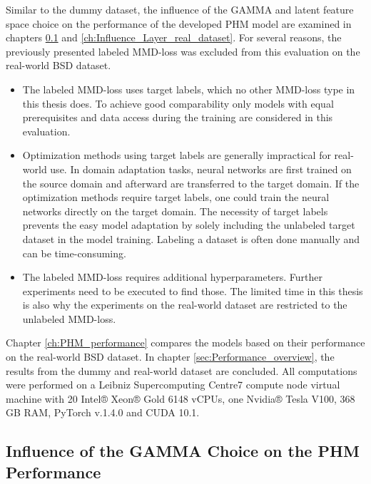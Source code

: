 Similar to the dummy dataset, the influence of the GAMMA and latent feature space choice on the performance of the developed PHM model are examined in chapters \ref{ch:Influence_GAMMA_real_dataset} and \ref{ch:Influence_Layer_real_dataset}. For several reasons, the previously presented labeled MMD-loss was excluded from this evaluation on the real-world BSD dataset. 
\begin{itemize}
    \item The labeled MMD-loss uses target labels, which no other MMD-loss type in this thesis does. To achieve good comparability only models with equal prerequisites and data access during the training are considered in this evaluation.
    \item Optimization methods using target labels are generally impractical for real-world use. In domain adaptation tasks, neural networks are first trained on the source domain and afterward are transferred to the target domain. If the optimization methods require target labels, one could train the neural networks directly on the target domain. The necessity of target labels prevents the easy model adaptation by solely including the unlabeled target dataset in the model training. Labeling a dataset is often done manually and can be time-consuming.
    \item The labeled MMD-loss requires additional hyperparameters. Further experiments need to be executed to find those. The limited time in this thesis is also why the experiments on the real-world dataset are restricted to the unlabeled MMD-loss. 
\end{itemize}

Chapter \ref{ch:PHM_performance} compares the models based on their performance on the real-world BSD dataset. In chapter \ref{sec:Performance_overview}, the results from the dummy and real-world dataset are concluded. All computations were performed on a Leibniz Supercomputing Centre7 compute node virtual machine with 20 Intel® Xeon® Gold 6148 vCPUs, one Nvidia® Tesla V100, 368 GB RAM, PyTorch v.1.4.0 and CUDA 10.1.


\subsection{Influence of the GAMMA Choice on the PHM Performance}\label{ch:Influence_GAMMA_real_dataset}

